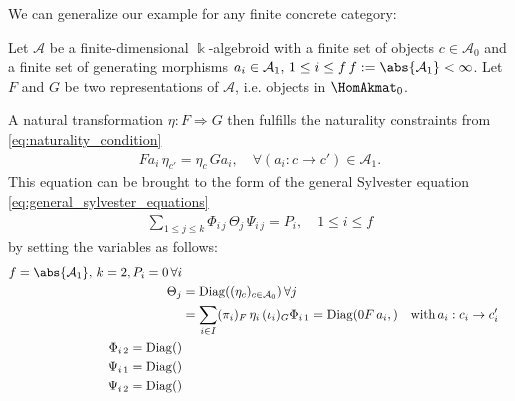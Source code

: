 
We can generalize our example for any finite concrete category:

\begin{remark}
Let $\mathcal{A}$ be a finite-dimensional $\Bbbk$-algebroid with a finite set of objects $c \in \mathcal{A}_{0}$ and a finite set of
generating morphisms $a_{i} \in \mathcal{A}_{1},\,1\leq i \leq f\,f := \abs{\mathcal{A}_{1}} < \infty$.
Let $F$ and $G$ be two representations of $\mathcal{A}$, i.e. objects in $\HomAkmat_{0}$. 

A natural transformation $\eta : F \Rightarrow G$ then fulfills the naturality constraints from \eqref{eq:naturality_condition}
\begin{align*}
Fa_{i}\, \eta_{c'} = \eta_{c}\, Ga_{i},\quad\forall (a_{i} : c \rightarrow c') \in \mathcal{A}_{1}.
\end{align*}
This equation can be brought to the form of the general Sylvester equation \eqref{eq:general_sylvester_equations}
\begin{align*}
\sum_{1\leq j \leq k} \Phi_{i\,j}\, \Theta_{j}\, \Psi_{i\,j} = P_{i}, \quad 1\leq i \leq f
\end{align*}
by setting the variables as follows:
\begin{align}
f = \abs{\mathcal{A}_{1}},\, k = 2, P_{i} = 0\,\forall i \\
\Theta_{j} &= \mathrm{Diag}((\eta_{c})_{c \in \mathcal{A}_{0}})\,\forall j \\
&= \sum_{i\in I} (\pi_{i})_{F}\,\eta_{i}\,(\iota_{i})_{G}
\Phi_{i\,1} = \mathrm{Diag}(0F\,a_{i},)\quad \text{with}\, a_{i} : c_{i} \rightarrow c'_{i}\\
\Phi_{i\,2} = \mathrm{Diag}()\\
\Psi_{i\,1} = \mathrm{Diag}()\\
\Psi_{i\,2} = \mathrm{Diag}()
\end{align}

\end{remark}